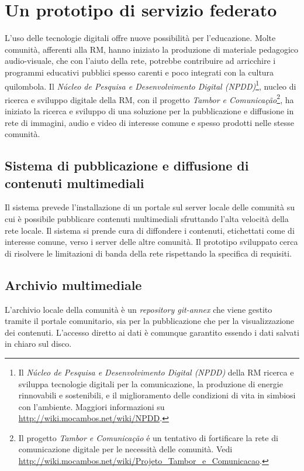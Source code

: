 
\chapter{Un prototipo di servizio federato}
\label{Capitolo4}

L'uso delle tecnologie digitali offre nuove possibilità per
l'educazione. Molte comunità, afferenti alla RM, hanno iniziato la
produzione di materiale pedagogico audio-visuale, che con l'aiuto
della rete, potrebbe contribuire ad arricchire i programmi educativi
pubblici spesso carenti e poco integrati con la cultura quilombola. Il
\emph{Núcleo de Pesquisa e Desenvolvimento Digital (NPDD)}\footnote{Il
  \emph{Núcleo de Pesquisa e Desenvolvimento Digital (NPDD)} della RM
  ricerca e sviluppa tecnologie digitali per la comunicazione, la
  produzione di energie rinnovabili e sostenibili, e il miglioramento
  delle condizioni di vita in simbiosi con l'ambiente. Maggiori
  informazioni su \url{http://wiki.mocambos.net/wiki/NPDD}.}, nucleo
di ricerca e sviluppo digitale della RM, con il progetto \emph{Tambor
  e Comunicação}\footnote{Il progetto \emph{Tambor e Comunicação} é un
  tentativo di fortificare la rete di comunicazione digitale per le
  necessità delle comunità. Vedi
  \url{http://wiki.mocambos.net/wiki/Projeto_Tambor_e_Comunicacao}.},
ha iniziato la ricerca e sviluppo di una soluzione per la
pubblicazione e diffusione in rete di immagini, audio e video di
interesse comune e spesso prodotti nelle stesse comunità.

\section{Sistema di pubblicazione e diffusione di contenuti
  multimediali}
Il sistema prevede l'installazione di un portale sul server locale
delle comunità su cui è possibile pubblicare contenuti multimediali
sfruttando l'alta velocità della rete locale. Il sistema si prende
cura di diffondere i contenuti, etichettati come di interesse comune,
verso i server delle altre comunità. Il prototipo sviluppato cerca di
risolvere le limitazioni di banda della rete rispettando la specifica
di requisiti. 

\section{Archivio multimediale}
L'archivio locale della comunità è un \emph{repository git-annex} che
viene gestito tramite il portale comunitario, sia per la pubblicazione
che per la visualizzazione dei contenuti. L'accesso diretto ai dati è
comunque garantito essendo i dati salvati in chiaro sul disco. 

